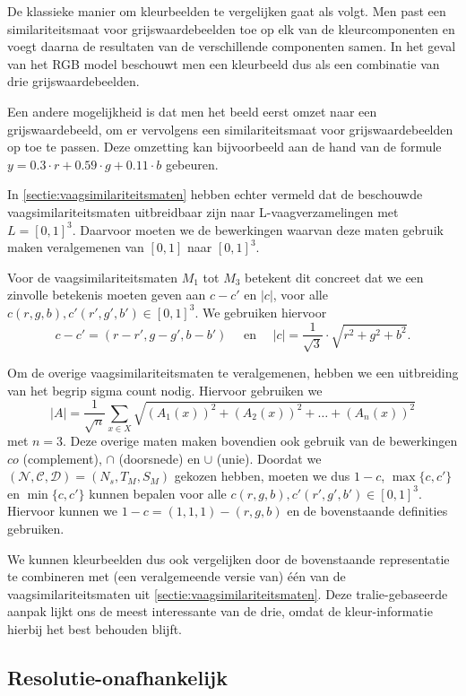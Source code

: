 De klassieke manier om kleurbeelden te vergelijken gaat als volgt. Men past een similariteitsmaat 
voor grijswaardebeelden toe op elk van de kleurcomponenten en voegt daarna de resultaten van de
verschillende componenten samen. In het geval van het RGB model beschouwt men een
kleurbeeld dus als een combinatie van drie grijswaardebeelden. 

Een andere mogelijkheid is dat men het beeld eerst omzet naar een grijswaardebeeld, om er 
vervolgens een similariteitsmaat voor grijswaardebeelden op toe te passen. Deze omzetting kan 
bijvoorbeeld aan de hand van de formule $y = 0.3 \cdot r + 0.59 \cdot g + 0.11 \cdot b$ gebeuren.

In \ref{sectie:vaagsimilariteitsmaten} hebben echter vermeld dat de beschouwde 
vaagsimilariteitsmaten uitbreidbaar zijn naar L-vaag\-ver\-za\-me\-ling\-en met
$L=[0,1]^3$. Daarvoor moeten we de bewerkingen waarvan deze maten gebruik maken veralgemenen van 
$[0,1]$ naar $[0,1]^3$. 

Voor de vaagsimilariteitsmaten $M_1$ tot $M_3$ betekent dit concreet dat we een zinvolle betekenis 
moeten geven aan $c - c'$ en $|c|$, voor alle $c(r,g,b),c'(r',g',b') \in [0,1]^3$. We gebruiken
hiervoor 
$$
c - c' = (r-r',g-g',b-b') \quad \textrm{ en } \quad |c| = \frac{1}{\sqrt{3}} \cdot \sqrt{r^2 + g^2 + b^2}.
$$

Om de overige vaagsimilariteitsmaten te veralgemenen, hebben we een uitbreiding van het
begrip sigma count nodig. Hiervoor gebruiken we
$$
|A|=\frac{1}{\sqrt{n}}\sum_{x \in X}\sqrt{(A_1(x))^2+(A_2(x))^2+\ldots+(A_n(x))^2}
$$
met $n=3$. Deze overige maten maken bovendien ook gebruik van de bewerkingen $co$ (complement), 
$\cap$ (doorsnede) en $\cup$ (unie). Doordat we 
$(\mathcal{N},\mathcal{C},\mathcal{D})=(N_s,T_M,S_M)$ gekozen hebben, moeten we
dus $1 - c$, $\max \{c,c'\}$ en $\min \{c,c'\}$ kunnen bepalen voor alle 
$c(r,g,b),c'(r',g',b') \in [0,1]^3$. Hiervoor kunnen we $1 - c = (1,1,1) - (r,g,b)$ en de
bovenstaande definities gebruiken.

We kunnen kleurbeelden dus ook vergelijken door de bovenstaande representatie 
te combineren met (een veralgemeende versie van) \'e\'en van de 
vaagsimilariteitsmaten uit \ref{sectie:vaagsimilariteitsmaten}. 
Deze tralie-gebaseerde aanpak lijkt ons de meest interessante van de drie, omdat
de kleur-informatie hierbij het best behouden blijft.


\subsection{Resolutie-onafhankelijk}
\label{sectie:res-onafh}

